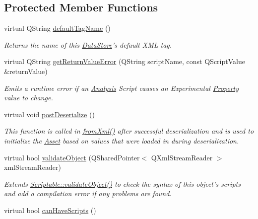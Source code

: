 \subsection*{Protected Member Functions}
\begin{DoxyCompactItemize}
\item 
virtual Q\-String \hyperlink{class_picto_1_1_analysis_script_holder_a8424afe1832f1b1b7c0753a9b19d3bc9}{default\-Tag\-Name} ()
\begin{DoxyCompactList}\small\item\em Returns the name of this \hyperlink{class_picto_1_1_data_store}{Data\-Store}'s default X\-M\-L tag. \end{DoxyCompactList}\item 
virtual Q\-String \hyperlink{class_picto_1_1_analysis_script_holder_a18c4144aa6c25fcb6e1ec01304d5ed2b}{get\-Return\-Value\-Error} (Q\-String script\-Name, const Q\-Script\-Value \&return\-Value)
\begin{DoxyCompactList}\small\item\em Emits a runtime error if an \hyperlink{class_picto_1_1_analysis}{Analysis} Script causes an Experimental \hyperlink{class_picto_1_1_property}{Property} value to change. \end{DoxyCompactList}\item 
virtual void \hyperlink{class_picto_1_1_analysis_script_holder_a02b68cce54cb16c264cdc91afe442517}{post\-Deserialize} ()
\begin{DoxyCompactList}\small\item\em This function is called in \hyperlink{class_picto_1_1_asset_a8bed4da09ecb1c07ce0dab313a9aba67}{from\-Xml()} after successful deserialization and is used to initialize the \hyperlink{class_picto_1_1_asset}{Asset} based on values that were loaded in during deserialization. \end{DoxyCompactList}\item 
\hypertarget{class_picto_1_1_analysis_script_holder_a98ebdcd9a4c026715b350bb24f181a48}{virtual bool \hyperlink{class_picto_1_1_analysis_script_holder_a98ebdcd9a4c026715b350bb24f181a48}{validate\-Object} (Q\-Shared\-Pointer$<$ Q\-Xml\-Stream\-Reader $>$ xml\-Stream\-Reader)}\label{class_picto_1_1_analysis_script_holder_a98ebdcd9a4c026715b350bb24f181a48}

\begin{DoxyCompactList}\small\item\em Extends \hyperlink{class_picto_1_1_scriptable_ab6e2944c43a3b5d418bf7b251594386d}{Scriptable\-::validate\-Object()} to check the syntax of this object's scripts and add a compilation error if any problems are found. \end{DoxyCompactList}\item 
\hypertarget{class_picto_1_1_analysis_script_holder_a11d11762bc1afd555b1e7f92d29dffcd}{virtual bool \hyperlink{class_picto_1_1_analysis_script_holder_a11d11762bc1afd555b1e7f92d29dffcd}{can\-Have\-Scripts} ()}\label{class_picto_1_1_analysis_script_holder_a11d11762bc1afd555b1e7f92d29dffcd}


\end{DoxyCompactItemize}
